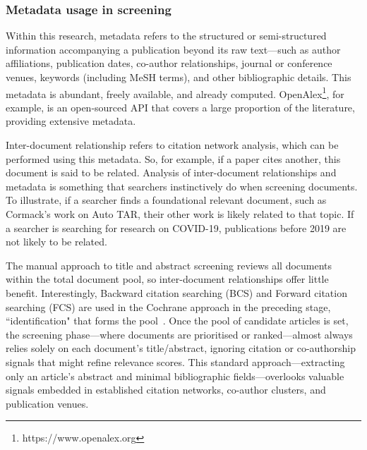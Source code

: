 \documentclass[10pt, english]{article}
\begin{document}
\subsubsection{Metadata usage in screening}

Within this research, metadata refers to the structured or semi-structured information accompanying a publication beyond its raw text—such as author affiliations, publication dates, co-author relationships, journal or conference venues, keywords (including MeSH terms), and other bibliographic details. This metadata is abundant, freely available, and already computed. OpenAlex\footnote{https://www.openalex.org}, for example, is an open-sourced API that covers a large proportion of the literature, providing extensive metadata.

Inter-document relationship refers to citation network analysis, which can be performed using this metadata. So, for example, if a paper cites another, this document is said to be related. Analysis of inter-document relationships and metadata is something that searchers instinctively do when screening documents. To illustrate, if a searcher finds a foundational relevant document, such as Cormack's work on Auto TAR, their other work is likely related to that topic. If a searcher is searching for research on COVID-19, publications before 2019 are not likely to be related. 

The manual approach to title and abstract screening reviews all documents within the total document pool, so inter-document relationships offer little benefit. Interestingly, Backward citation searching (BCS) and Forward citation searching (FCS) are used in the Cochrane approach in the preceding stage, ``identification" that forms the pool~\cite{briscoe_conduct_2020, noauthor_mecir_nodate}. Once the pool of candidate articles is set, the screening phase—where documents are prioritised or ranked—almost always relies solely on each document’s title/abstract, ignoring citation or co-authorship signals that might refine relevance scores. This standard approach—extracting only an article’s abstract and minimal bibliographic fields—overlooks valuable signals embedded in established citation networks, co-author clusters, and publication venues.
\end{document}
